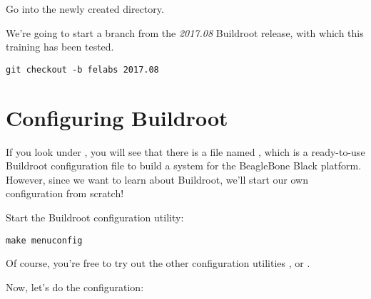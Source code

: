 Go into the newly created  directory.

We're going to start a branch from the {\em 2017.08} Buildroot
release, with which this training has been tested.

\begin{verbatim}
git checkout -b felabs 2017.08
\end{verbatim}

\section{Configuring Buildroot}

If you look under , you will see that there is a file
named , which is a ready-to-use Buildroot
configuration file to build a system for the BeagleBone Black
platform. However, since we want to learn about Buildroot, we'll start
our own configuration from scratch!

Start the Buildroot configuration utility:

\begin{verbatim}
make menuconfig
\end{verbatim}

Of course, you're free to try out the other configuration utilities
,  or .

Now, let's do the configuration:

